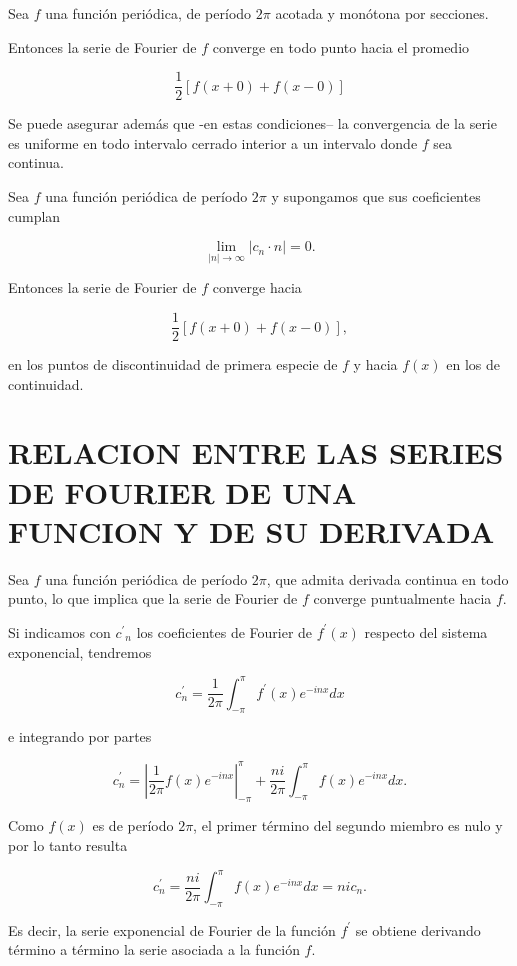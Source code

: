 \documentclass[10pt]{article}
\theoremstyle{plain}
\theoremstyle{definition}
\theoremstyle{remark}
\begin{document}
Sea $f$ una función periódica, de período $2 \pi$ acotada y monótona por secciones.

Entonces la serie de Fourier de $f$ converge en todo punto hacia el promedio


$$
\frac{1}{2}[f(x+0)+f(x-0)]
$$

Se puede asegurar además que -en estas condiciones-- la convergencia de la serie es uniforme en todo intervalo cerrado interior a un intervalo donde $f$ sea continua.

Sea $f$ una función periódica de período $2 \pi$ y supongamos que sus coeficientes cumplan

$$
\lim _{|n| \rightarrow \infty}\left|c_{n} \cdot n\right|=0 .
$$

Entonces la serie de Fourier de $f$ converge hacia

$$
\frac{1}{2}[f(x+0)+f(x-0)],
$$

en los puntos de discontinuidad de primera especie de $f$ y hacia $f(x)$ en los de continuidad.

\section*{RELACION ENTRE LAS SERIES DE FOURIER DE UNA FUNCION Y DE SU DERIVADA}
Sea $f$ una función periódica de período $2 \pi$, que admita derivada continua en todo punto, lo que implica que la serie de Fourier de $f$ converge puntualmente hacia $f$.

Si indicamos con $c^{\prime}{ }_{n}$ los coeficientes de Fourier de $f^{\prime}(x)$ respecto del sistema exponencial, tendremos

$$
c_{n}^{\prime}=\frac{1}{2 \pi} \int_{-\pi}^{\pi} f^{\prime}(x) e^{-i n x} d x
$$

e integrando por partes

$$
c_{n}^{\prime}=\left|\frac{1}{2 \pi} f(x) e^{-i n x}\right|_{-\pi}^{\pi}+\frac{n i}{2 \pi} \int_{-\pi}^{\pi} f(x) e^{-i n x} d x .
$$

Como $f(x)$ es de período $2 \pi$, el primer término del segundo miembro es nulo y por lo tanto resulta


\begin{equation*}
c_{n}^{\prime}=\frac{n i}{2 \pi} \int_{-\pi}^{\pi} f(x) e^{-i n x} d x=n i c_{n} . \tag{5-22}
\end{equation*}


Es decir, la serie exponencial de Fourier de la función $f^{\prime}$ se obtiene derivando término a término la serie asociada a la función $f$.
\end{document}
